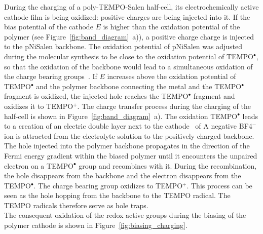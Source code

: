 \par
During the charging of a poly-TEMPO-Salen half-cell, its electrochemically active cathode film is being oxidized: positive charges are being injected into it. If the bias potential of the cathode $E$ is higher than the oxidation potential of the polymer (see Figure~\ref{fig:band_diagram}~a)), a positive charge charge is injected to the pNiSalen backbone. The oxidation potential of pNiSalen was adjusted during the molecular synthesis to be close to the oxidation potential of TEMPO$^{\bullet}$, so that the oxidation of the backbone would lead to a simultaneous oxidation of the charge bearing groups~\cite{Vereshchagin2020}. If $E$ increases above the oxidation potential of TEMPO$^{\bullet}$ and the polymer backbone connecting the metal and the TEMPO$^{\bullet}$ fragment is oxidized, the injected hole reaches the TEMPO$^{\bullet}$ fragment and oxidizes it to TEMPO$^+$. The charge transfer process during the charging of the half-cell is shown in Figure~\ref{fig:band_diagram}~a). The oxidation TEMPO$^{\bullet}$ leads to a creation of an electric double layer next to the cathode~\cite{Bhojane2022} of A negative BF4${^-}$ ion is attracted from the electrolyte solution to the positively charged backbone.\\

The hole injected into the polymer backbone propagates in the direction of the Fermi energy gradient within the biased polymer until it encounters the unpaired electron on a TEMPO$^{\bullet}$ group and recombines with it. During the recombination, the hole disappears from the backbone and the electron disappears from the TEMPO$^{\bullet}$. The charge bearing group oxidizes to TEMPO$^+$. This process can be seen as the hole hopping from the backbone to the TEMPO radical. The TEMPO radicals therefore serve as hole traps.\\

The consequent oxidation of the redox active groups during the biasing of the polymer cathode is shown in Figure~\ref{fig:biasing_charging}.

